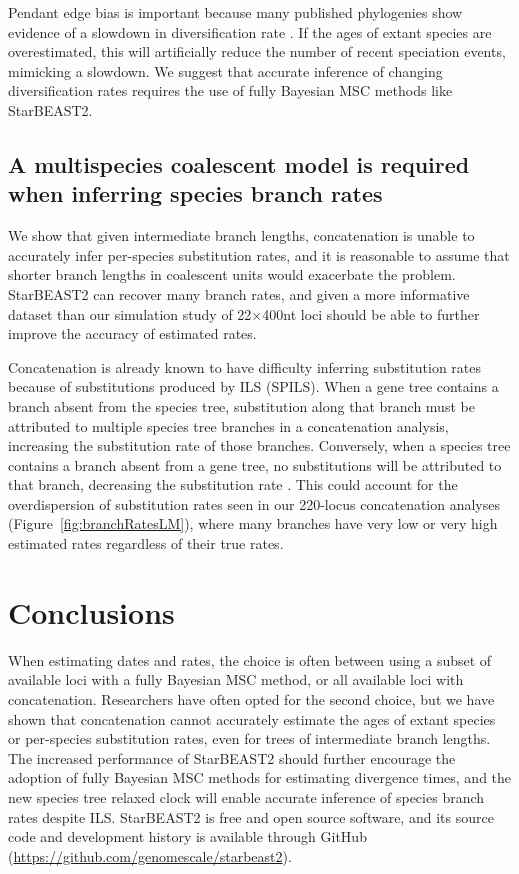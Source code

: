 \documentclass[12pt]{article}
\begin{document}
Pendant edge bias is important because many published phylogenies show evidence
of a slowdown in diversification rate \citep{Moen2014190}. If the ages of extant
species are overestimated, this will artificially reduce the number of recent speciation events,
mimicking a slowdown. We suggest that accurate inference of changing
diversification rates requires the use of fully Bayesian MSC methods like
StarBEAST2.

\subsection*{A multispecies coalescent model is required when inferring species branch rates}

We show that given intermediate branch lengths, concatenation is unable to
accurately infer per-species substitution rates, and it is reasonable to assume
that shorter branch lengths in coalescent units would exacerbate the problem.
StarBEAST2 can recover many branch rates, and given a more informative dataset
than our simulation study of 22$\times$400nt loci should be able to further improve
the accuracy of estimated rates.

Concatenation is already known to have difficulty inferring substitution rates
because of substitutions produced by ILS (SPILS). When a
gene tree contains a branch absent from the species tree, substitution along
that branch must be attributed to multiple species tree branches in a
concatenation analysis, increasing the substitution rate of those branches.
Conversely, when a species tree contains a branch absent from a gene tree, no
substitutions will be attributed to that branch, decreasing the substitution
rate \citep{Mendes28022016}. This could account for the overdispersion of
substitution rates seen in our 220-locus concatenation analyses
(Figure~\ref{fig:branchRatesLM}), where many branches have very low or very high
estimated rates regardless of their true rates.

\section*{Conclusions}

When estimating dates and rates, the choice is often between using a subset of
available loci with a fully Bayesian MSC method, or all available loci with
concatenation. Researchers have often opted for the second choice, but we have
shown that concatenation cannot accurately estimate the ages of extant species
or per-species substitution rates, even for trees of intermediate branch lengths. The
increased performance of StarBEAST2 should further encourage the adoption of
fully Bayesian MSC methods for estimating divergence times, and the new species
tree relaxed clock will enable accurate inference of species branch rates despite
ILS. StarBEAST2 is free and open source software, and its source code and
development history is available through GitHub
(\url{https://github.com/genomescale/starbeast2}).
\end{document}
